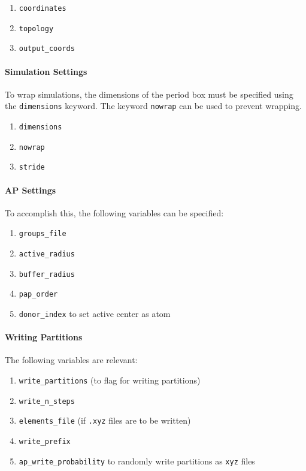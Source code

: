 \documentclass{article}
\begin{document}
\begin{enumerate}
	\item \texttt{coordinates}
	\item \texttt{topology}
	\item \texttt{output\_coords}
\end{enumerate}


\paragraph{Simulation Settings}
To wrap simulations, the dimensions of the period box must be specified using the \texttt{dimensions} keyword. The keyword \texttt{nowrap} can be used to prevent wrapping.

\begin{enumerate}
	\item \texttt{dimensions}
	\item \texttt{nowrap}
	\item \texttt{stride}
\end{enumerate}

\paragraph{AP Settings}
To accomplish this, the following variables can be specified:
\begin{enumerate}
	\item \texttt{groups\_file}
	\item \texttt{active\_radius}
	\item \texttt{buffer\_radius}
	\item \texttt{pap\_order}
	\item \texttt{donor\_index} to set active center as atom	
\end{enumerate}

\paragraph{Writing Partitions}
The following variables are relevant:
\begin{enumerate}
	\item \texttt{write\_partitions} (to flag for writing partitions)
	\item \texttt{write\_n\_steps}
	\item \texttt{elements\_file} (if \texttt{.xyz} files are to be written)
	\item \texttt{write\_prefix}
	\item \texttt{ap\_write\_probability} to randomly write partitions as \texttt{xyz} files	
\end{enumerate} 
\end{document}
